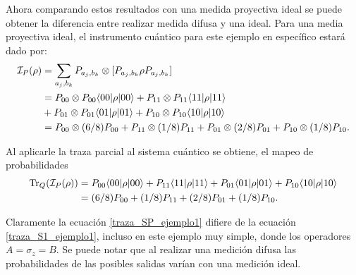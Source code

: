 {\begin{comment}
\begin{equation}\label{traza_A3_ejemplo1.1}
    \begin{split}
        \tr_C(\mathcal{I}_3(\rho)) &=P_{00} \rho P_{00} + P_{11} \rho P_{01}+q\left[P_{01}\rho P_{01}+ P_{10}\rho P_{10}\right]\\
        &+{(1-q)} (|10\rala10|+|01\rala01|)\rho (|10\rala10|+|01\rala01|).\\
    \end{split}
\end{equation}
\end{comment} %

Ahora comparando estos resultados con una medida proyectiva ideal se puede obtener la diferencia entre realizar medida difusa y una ideal. Para una media proyectiva ideal, el instrumento cuántico para este ejemplo en específico estará dado por: \begin{equation}\label{proyectiva_ideal_ejemplo}
    \begin{split}
        \mathcal{I}_P(\rho)&=\sum_{a_j,b_k}P_{a_j,b_k}\otimes[P_{a_j,b_k}\rho P_{a_j,b_k}]\\
        &=P_{00}\otimes P_{00} \langle 00|\rho|00\rangle + P_{11}\otimes P_{11} \langle 11|\rho|11\rangle\\
        &+P_{01} \otimes P_{01}\langle 01|\rho|01\rangle +P_{10} \otimes P_{10} \langle 10|\rho|10\rangle\\
        &=P_{00}\otimes (6/8)P_{00} + P_{11}\otimes (1/8)P_{11}+P_{01} \otimes (2/8)P_{01} +P_{10} \otimes (1/8)P_{10}.\\
    \end{split}
\end{equation}


Al aplicarle la traza parcial al sistema cuántico se obtiene, el mapeo de probabilidades \begin{equation}\label{traza_SP_ejemplo1}
    \begin{split}
        {\rm Tr}_Q(\mathcal{I}_P(\rho)) &= P_{00} \langle 00|\rho|00\rangle + P_{11} \langle 11|\rho|11\rangle+P_{01}\langle 01|\rho|01\rangle +P_{10} \langle 10|\rho|10\rangle\\
        &=(6/8)P_{00} + (1/8)P_{11}+(2/8)P_{01} + (1/8)P_{10}.\\
    \end{split}
\end{equation}


Claramente la ecuación {\ref{traza_SP_ejemplo1}} difiere de la ecuación {\ref{traza_S1_ejemplo1}}, %
incluso en este ejemplo muy simple, donde los operadores $A=\sigma _z=B$. Se puede notar que al realizar una medición difusa las probabilidades de las posibles salidas varían con una medición ideal.

}
